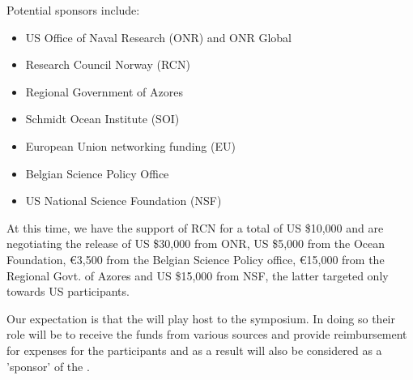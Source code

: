Potential sponsors include:

\begin{itemize}[noitemsep,topsep=0pt,parsep=0pt,partopsep=0pt]

  \item US Office of Naval Research (ONR) and ONR Global
  \item Research Council Norway (RCN)
  \item Regional Government of Azores
  \item Schmidt Ocean Institute (SOI)
  \item European Union networking funding (EU)
  \item Belgian Science Policy Office
  \item US National Science Foundation (NSF)

\end{itemize}

\noindent
At this time, we have the support of RCN for a total of US \$10,000
and are negotiating the release of US \$30,000 from ONR, US \$5,000
from the Ocean Foundation, \euro 3,500 from the Belgian Science
Policy office, \euro 15,000 from the Regional Govt. of Azores and US
\$15,000 from NSF, the latter targeted only towards US participants.

Our expectation is that the \air will play host to the symposium. In
doing so their role will be to receive the funds from various sources
and provide reimbursement for expenses for the participants and as a
result will also be considered as a 'sponsor' of the \sympe.

